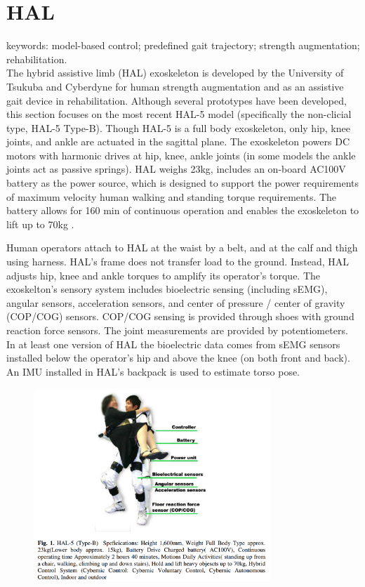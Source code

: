 \section{HAL}
\label{exo:hal}
\begin{refsection}

keywords: model-based control; predefined gait trajectory; strength augmentation; rehabilitation.\\

The hybrid assistive limb (HAL) exoskeleton is developed by the University of Tsukuba and Cyberdyne for human strength augmentation and as an assistive gait device in rehabilitation.  Although several prototypes have been developed, this section focuses on the most recent HAL-5 model (specifically the non-clicial type, HAL-5 Type-B). Though HAL-5 is a full body exoskeleton, only hip, knee joints, and ankle are actuated in the sagittal plane.  The exoskeleton powers DC motors with harmonic drives at hip, knee, ankle joints (in some models the ankle joints act as passive springs).  HAL weighs 23kg, includes an on-board AC100V battery as the power source, which is designed to support the power requirements of maximum velocity human walking and standing torque requirements.  The battery allows for 160 min of continuous operation and enables the exoskeleton to lift up to 70kg \cite{HALassist2011}.  

Human operators attach to HAL at the waist by a belt, and at the calf and thigh using harness. HAL's frame does not transfer load to the ground.  Instead, HAL adjusts hip, knee and ankle torques to amplify its operator's torque. The exoskelton's sensory system includes bioelectric sensing (including sEMG), angular sensors, acceleration sensors, and center of pressure / center of gravity (COP/COG) sensors.  COP/COG sensing is provided through shoes with ground reaction force sensors.  The joint measurements are provided by potentiometers.
In at least one version of HAL the bioelectric data comes from sEMG sensors installed below the operator's hip and above the knee (on both front and back).
An IMU installed in HAL's backpack is used to estimate torso pose.


\begin{figure}[ht]
  \centering
  \includegraphics[width=3.5in]{exos/figs/hal-5_B_diagram.png}
\end{figure}



\end{refsection}
